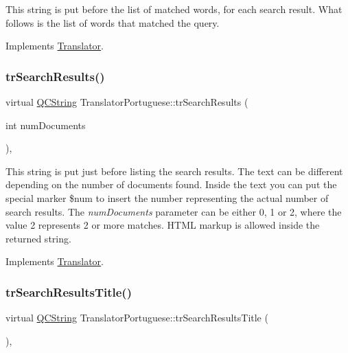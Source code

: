 This string is put before the list of matched words, for each search result. What follows is the list of words that matched the query. 

Implements \mbox{\hyperlink{class_translator}{Translator}}.

\mbox{\label{class_translator_portuguese_a41da542c0d9900f3ac2ace6a3f0d5f1d}} 
\subsubsection{\texorpdfstring{trSearchResults()}{trSearchResults()}}
{\footnotesize\ttfamily virtual \mbox{\hyperlink{class_q_c_string}{Q\+C\+String}} Translator\+Portuguese\+::tr\+Search\+Results (\begin{DoxyParamCaption}\item[{int}]{num\+Documents }\end{DoxyParamCaption})\hspace{0.3cm}{\ttfamily [inline]}, {\ttfamily [virtual]}}

This string is put just before listing the search results. The text can be different depending on the number of documents found. Inside the text you can put the special marker \$num to insert the number representing the actual number of search results. The {\itshape num\+Documents} parameter can be either 0, 1 or 2, where the value 2 represents 2 or more matches. H\+T\+ML markup is allowed inside the returned string. 

Implements \mbox{\hyperlink{class_translator}{Translator}}.

\mbox{\label{class_translator_portuguese_a6ce6b3b4a0170048b4aa551e6c0b9d7a}} 
\subsubsection{\texorpdfstring{trSearchResultsTitle()}{trSearchResultsTitle()}}
{\footnotesize\ttfamily virtual \mbox{\hyperlink{class_q_c_string}{Q\+C\+String}} Translator\+Portuguese\+::tr\+Search\+Results\+Title (\begin{DoxyParamCaption}{ }\end{DoxyParamCaption})\hspace{0.3cm}{\ttfamily [inline]}, {\ttfamily [virtual]}}


